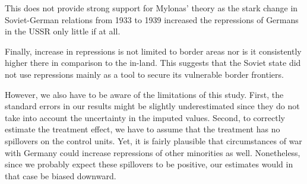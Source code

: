  
This does not provide strong support for Mylonas'  \citeyearpar{mylonas_politics_2013} theory as the stark change in Soviet-German relations from 1933 to 1939 increased the repressions of Germans in the USSR only little if at all. 

Finally, increase in repressions is not limited to border areas nor is 
it  consistently higher there in comparison to the in-land. 
This suggests that the Soviet state did not use repressions mainly as a tool to secure its vulnerable border frontiers. %


However, we also  have to be aware of the limitations of this study. 
First, the standard errors in our results might be slightly underestimated  since they do not take into account the uncertainty in the imputed values. 
Second, to correctly estimate the treatment effect, we have to assume that the treatment has no spillovers on the control units. Yet, it is fairly plausible that circumstances of war with Germany could increase repressions of other minorities as well.
Nonetheless, since we probably expect these spillovers  to be positive, our estimates would in that case be biased downward.


